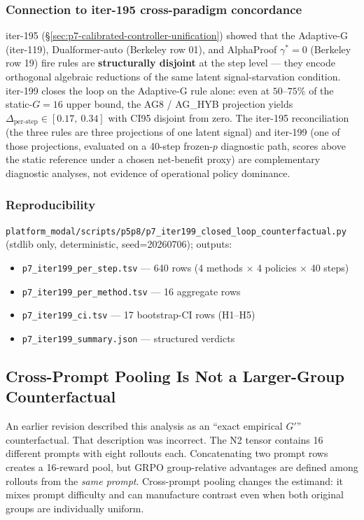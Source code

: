 \documentclass{article}
\begin{document}
\subsubsection*{Connection to iter-195 cross-paradigm concordance}

iter-195 (\S\ref{sec:p7-calibrated-controller-unification}) showed that the
Adaptive-G (iter-119), Dualformer-auto (Berkeley row 01), and AlphaProof
$\gamma^*=0$ (Berkeley row 19) fire rules are \textbf{structurally
disjoint} at the step level — they encode orthogonal algebraic reductions of
the same latent signal-starvation condition. iter-199 closes the loop on the
Adaptive-G rule alone: even at $50$–$75\%$ of the static-$G=16$ upper bound,
the AG8 / AG\_HYB projection yields
$\Delta_{\text{per-step}} \in [0.17,\ 0.34]$ with CI95 disjoint from zero.
The iter-195 reconciliation (the three rules are three projections of one
latent signal) and iter-199 (one of those projections, evaluated on a
40-step frozen-$p$ diagnostic path, scores above the static reference under a
chosen net-benefit proxy) are complementary diagnostic analyses, not evidence
of operational policy dominance.

\subsubsection*{Reproducibility}

\texttt{platform_modal/scripts/p5p8/p7\_iter199\_closed\_loop\_counterfactual.py} (stdlib
only, deterministic, seed=20260706); outputs:
\begin{itemize}
\item \texttt{p7\_iter199\_per\_step.tsv} — 640 rows (4 methods $\times$ 4 policies $\times$ 40 steps)
\item \texttt{p7\_iter199\_per\_method.tsv} — 16 aggregate rows
\item \texttt{p7\_iter199\_ci.tsv} — 17 bootstrap-CI rows (H1–H5)
\item \texttt{p7\_iter199\_summary.json} — structured verdicts
\end{itemize}
 \label{sec:p7-iter203-empirical-gprime}

\subsection{Cross-Prompt Pooling Is Not a Larger-Group Counterfactual}

An earlier revision described this analysis as an ``exact empirical $G'$''
counterfactual. That description was incorrect. The N2 tensor contains 16
different prompts with eight rollouts each. Concatenating two prompt rows creates
a 16-reward pool, but GRPO group-relative advantages are defined among rollouts
from the \emph{same prompt}. Cross-prompt pooling changes the estimand: it mixes
prompt difficulty and can manufacture contrast even when both original groups
are individually uniform.
\end{document}
